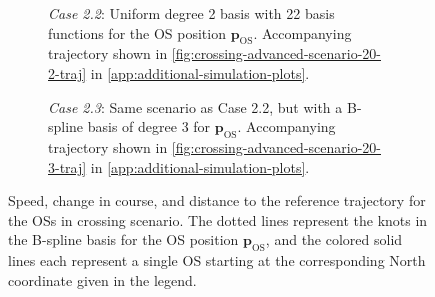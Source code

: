 \begin{figure}
    \centering
    \begin{subfigure}[b]{\textwidth}
        
        \caption{\emph{Case 2.2}: Uniform degree 2 basis with 22 basis functions for the OS position $\mathbf p_\text{OS}$. Accompanying trajectory shown in \cref{fig:crossing-advanced-scenario-20-2-traj} in \cref{app:additional-simulation-plots}.}
        \label{fig:crossing-advanced-scenario-20-2}
    \end{subfigure}
    \begin{subfigure}[b]{\textwidth}
        
        \caption{\emph{Case 2.3}: Same scenario as Case 2.2, but with a B-spline basis of degree 3 for $\mathbf p_\text{OS}$. Accompanying trajectory shown in \cref{fig:crossing-advanced-scenario-20-3-traj} in \cref{app:additional-simulation-plots}.}
        \label{fig:crossing-advanced-scenario-20-3}
    \end{subfigure}
    \caption{Speed, change in course, and distance to the reference trajectory for the OSs in crossing scenario. The dotted lines represent the knots in the B-spline basis for the OS position $\mathbf p_\text{OS}$, and the colored solid lines each represent a single OS starting at the corresponding North coordinate given in the legend.}
    \label{fig:crossing-advanced-scenario-metrics}
\end{figure}


